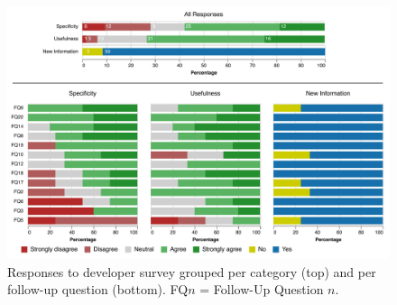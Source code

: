 \begin{figure}[t]
\centering
\includegraphics[width=0.95\linewidth]{figures/viz_group.pdf}
\caption{Responses to developer survey grouped per category (top) and per follow-up question (bottom). FQ$n$ = Follow-Up Question $n$.}
\label{fig:survey}
\end{figure}

